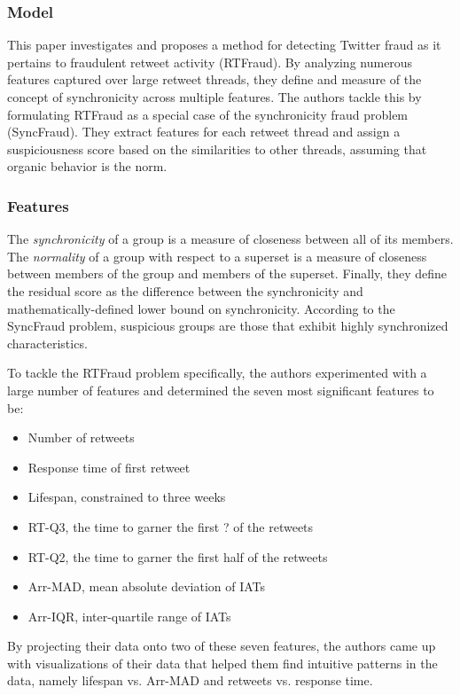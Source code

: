 \documentclass[11pt, oneside]{article}   	%
\begin{document}
\subsubsection*{Model}

\quad This paper investigates and proposes a method for detecting Twitter fraud as it pertains to fraudulent retweet activity (RTFraud).
By analyzing numerous features captured over large retweet threads, they define and measure of the concept of synchronicity across multiple features.
The authors tackle this by formulating RTFraud as a special case of the synchronicity fraud problem (SyncFraud).
They extract features for each retweet thread and assign a suspiciousness score based on the similarities to other threads, assuming that organic behavior is the norm.

\subsubsection*{Features}

\quad The \textit{synchronicity} of a group is a measure of closeness between all of its members.
The \textit{normality} of a group with respect to a superset is a measure of closeness between members of the group and members of the superset.
Finally, they define the residual score as the difference between the synchronicity and mathematically-defined lower bound on synchronicity.
According to the SyncFraud problem, suspicious groups are those that exhibit highly synchronized characteristics.

\quad To tackle the RTFraud problem specifically, the authors experimented with a large number of features and determined the seven most significant features to be:
\begin{itemize}
	\item Number of retweets
	\item Response time of first retweet
	\item Lifespan, constrained to three weeks
	\item RT-Q3, the time to garner the first ? of the retweets
	\item RT-Q2, the time to garner the first half of the retweets
	\item Arr-MAD, mean absolute deviation of IATs
	\item Arr-IQR, inter-quartile range of IATs
\end{itemize}

\quad By projecting their data onto two of these seven features, the authors came up with visualizations of their data that helped them find intuitive patterns in the data, namely lifespan vs. Arr-MAD and retweets vs. response time.
\end{document}
